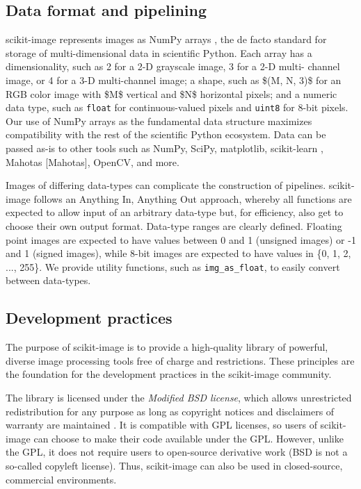 \documentclass[letterpaper,compsoc,twoside]{IEEEtran}
\begin{document}
\subsection{Data format and pipelining%
  \label{data-format-and-pipelining}%
}


scikit-image represents images as NumPy arrays \cite{numpy}, the de facto standard
for storage of multi-dimensional data in scientific Python. Each array has a
dimensionality, such as 2 for a 2-D grayscale image, 3 for a 2-D multi-
channel image, or 4 for a 3-D multi-channel image; a shape, such as \$(M, N, 3)\$
for an RGB color image with \$M\$ vertical and \$N\$ horizontal pixels; and a
numeric data type, such as \texttt{float} for continuous-valued pixels and \texttt{uint8}
for 8-bit pixels. Our use of NumPy arrays as the fundamental data structure
maximizes compatibility with the rest of the scientific Python ecosystem.
Data can be passed as-is to other tools such as NumPy, SciPy, matplotlib,
scikit-learn \cite{scikit-learn}, Mahotas {[}Mahotas{]}, OpenCV, and more.

Images of differing data-types can complicate the construction of pipelines.
scikit-image follows an \textquotedbl{}Anything In, Anything Out\textquotedbl{} approach, whereby all
functions are expected to allow input of an arbitrary data-type but, for
efficiency, also get to choose their own output format. Data-type
ranges are clearly defined. Floating point images are expected to have
values between 0 and 1 (unsigned images) or -1 and 1 (signed images), while
8-bit images are expected to have values in \{0, 1, 2, ..., 255\}. We provide
utility functions, such as \texttt{img\_as\_float}, to easily convert between
data-types.

\subsection{Development practices%
  \label{development-practices}%
}


The purpose of scikit-image is to provide a high-quality library of powerful,
diverse image processing tools free of charge and restrictions. These
principles are the foundation for the development practices in the scikit-image
community.

The library is licensed under the \emph{Modified BSD license}, which allows
unrestricted redistribution for any purpose as long as copyright notices
and disclaimers of warranty are maintained \cite{BSD}. It is compatible with GPL
licenses, so users of scikit-image can choose to make their code available
under the GPL. However, unlike the GPL, it does not require users to
open-source derivative work (BSD is not a so-called copyleft license). Thus,
scikit-image can also be used in closed-source, commercial environments.
\end{document}
